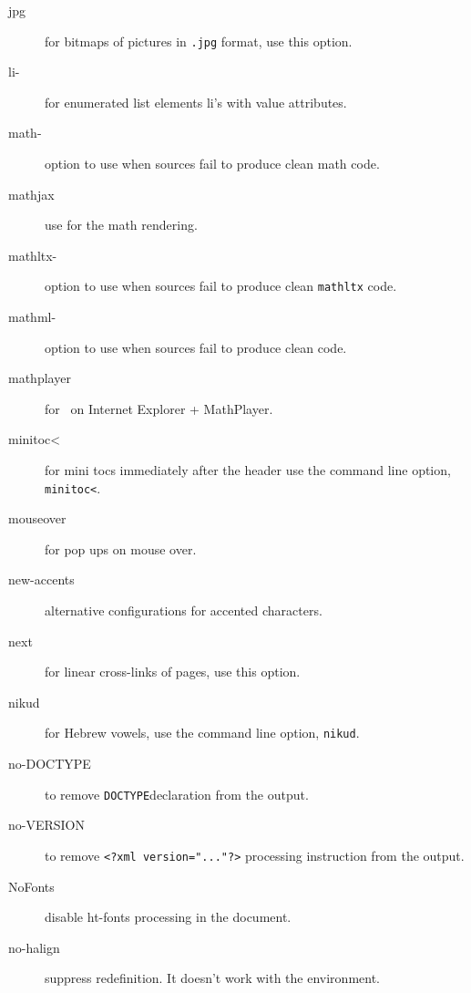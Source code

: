 \begin{description}

\item[jpg] for bitmaps of pictures in \verb=.jpg= format, use this
  option.

\item[li-] for enumerated list elements li's with value attributes.

\item[math-] option to use when sources fail to produce clean math
  code.

\item[mathjax] use  for the math rendering.

\item[mathltx-] option to use when sources fail to produce clean
  \verb=mathltx= code.

\item[mathml-] option to use when sources fail to produce clean
  \mathml code.

\item[mathplayer] for \mathml\ on Internet Explorer + MathPlayer.

\item[minitoc\textless] for mini tocs immediately after the header use the
  command line option, \verb=minitoc<=.

\item[mouseover] for pop ups on mouse over.

\item[new-accents] alternative configurations for accented characters. 

\item[next] for linear cross-links of pages, use this option.

\item[nikud] for Hebrew vowels, use the command line option,
  \verb=nikud=.

\item[no-DOCTYPE] to remove \texttt{DOCTYPE}\space declaration from
  the output.

\item[no-VERSION] to remove \verb+<?xml version="..."?>+ processing
  instruction from the output.

\item[NoFonts] disable ht-fonts processing in the document.

\item[no-halign] suppress \texcommand{\halign} redefinition. It doesn't work with the  environment.


\end{description}
